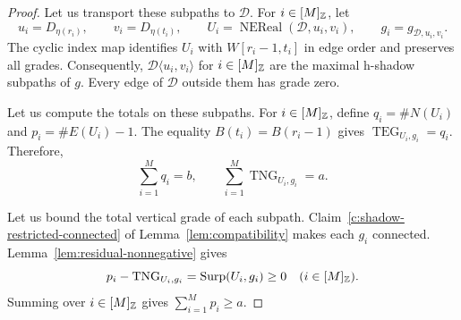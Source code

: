 \begin{proof}
Let us transport these subpaths to $\mathcal D$.
For $i\in[M]_{\mathbb Z}$, let
\[
 u_i=D_{\eta(r_i)},\qquad v_i=D_{\eta(t_i)},\qquad
 U_i=\operatorname{NEReal}(\mathcal D,u_i,v_i),\qquad
 g_i=g_{\mathcal D,u_i,v_i}.
\]
The cyclic index map identifies $U_i$ with $W[r_i-1,t_i]$ in edge order and preserves all grades.
Consequently, $\mathcal D\langle u_i,v_i\rangle$ for $i\in[M]_{\mathbb Z}$ are the maximal h-shadow subpaths of $g$.
Every edge of $\mathcal D$ outside them has grade zero.

Let us compute the totals on these subpaths.
For $i\in[M]_{\mathbb Z}$, define
$q_i=\#N(U_i)$ and $p_i=\#E(U_i)-1$.
The equality $B(t_i)=B(r_i-1)$ gives
$\operatorname{TEG}_{U_i,g_i}=q_i$.
Therefore,
\[
 \sum_{i=1}^{M}q_i=b,\qquad
 \sum_{i=1}^{M}\operatorname{TNG}_{U_i,g_i}=a.
\]

Let us bound the total vertical grade of each subpath.
Claim~\ref{c:shadow-restricted-connected} of Lemma~\ref{lem:compatibility} makes each $g_i$ connected.
Lemma~\ref{lem:residual-nonnegative} gives
\[
 p_i-\operatorname{TNG}_{U_i,g_i}
 =\operatorname{Surp}(U_i,g_i)\ge0\quad(i\in[M]_{\mathbb Z}).
\]
Summing over $i\in[M]_{\mathbb Z}$ gives $\sum_{i=1}^{M}p_i\ge a$.
\end{proof}

